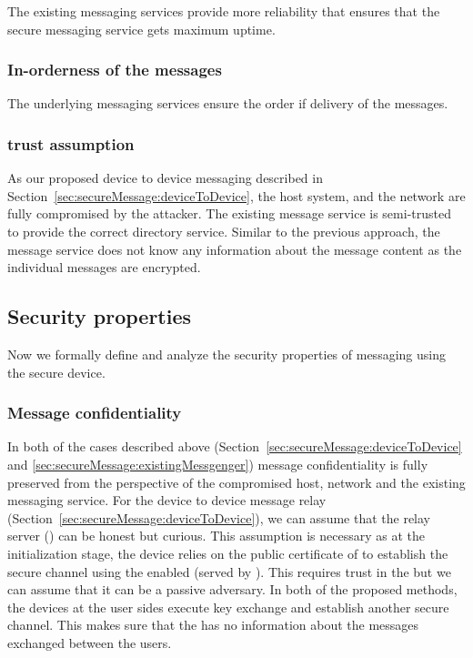  The existing messaging services provide more reliability that ensures that the secure messaging service gets maximum uptime. 


\subsubsection{In-orderness of the messages}

The underlying messaging services ensure the order if delivery of the messages.

\subsubsection{trust assumption}

As our proposed device to device messaging described in Section~\ref{sec:secureMessage:deviceToDevice}, the host system, and the network are fully compromised by the attacker. The existing message service is semi-trusted to provide the correct directory service. Similar to the previous approach, the message service does not know any information about the message content as the individual messages are encrypted.

\subsection{Security properties}
\label{sec:secureMessage:securityProperty}

Now we formally define and analyze the security properties of messaging using the secure \usb device.

\subsubsection{Message confidentiality}

In both of the cases described above (Section~\ref{sec:secureMessage:deviceToDevice} and \ref{sec:secureMessage:existingMessgenger}) message confidentiality is fully preserved from the perspective of the compromised host, network and the existing messaging service. For the device to device message relay (Section~\ref{sec:secureMessage:deviceToDevice}), we can assume that the relay server (\relay) can be honest but curious. This assumption is necessary as at the initialization stage, the \usb device relies on the public certificate of \relay to establish the secure channel using the \webusb enabled \js (served by \relay). This requires trust in the \relay but we can assume that it can be a passive adversary. In both of the proposed methods, the \usb devices at the user sides execute key exchange and establish another secure channel. This makes sure that the \relay has no information about the messages exchanged between the users.

